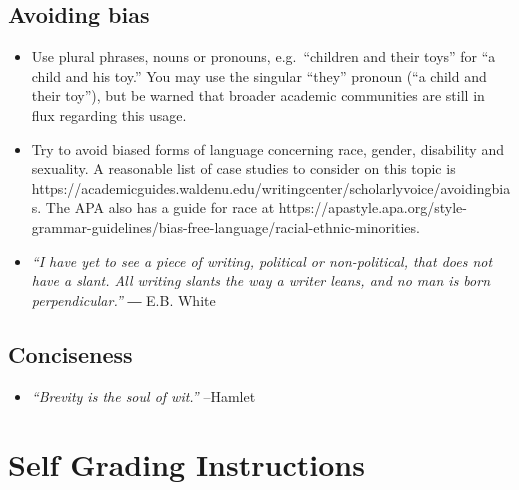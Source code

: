 \documentclass[
  letterpaper,
  DIV=11,
  numbers=noendperiod]{scrreprt}
\providecommand{\tightlist}{%
  \setlength{\itemsep}{0pt}\setlength{\parskip}{0pt}}\usepackage{longtable,booktabs,array}
\begin{document}
\hypertarget{avoiding-bias}{%
\section*{Avoiding bias}\label{avoiding-bias}}


\begin{itemize}
\tightlist
\item
  Use plural phrases, nouns or pronouns, e.g.~``children and their
  toys'' for ``a child and his toy.'' You may use the singular ``they''
  pronoun (``a child and their toy''), but be warned that broader
  academic communities are still in flux regarding this usage.
\item
  Try to avoid biased forms of language concerning race, gender,
  disability and sexuality. A reasonable list of case studies to
  consider on this topic is
  https://academicguides.waldenu.edu/writingcenter/scholarlyvoice/avoidingbias.
  The APA also has a guide for race at
  https://apastyle.apa.org/style-grammar-guidelines/bias-free-language/racial-ethnic-minorities.
\item
  \emph{``I have yet to see a piece of writing, political or
  non-political, that does not have a slant. All writing slants the way
  a writer leans, and no man is born perpendicular.''} ― E.B. White
\end{itemize}

\hypertarget{conciseness}{%
\section*{Conciseness}\label{conciseness}}


\begin{itemize}
\tightlist
\item
  \emph{``Brevity is the soul of wit.''} --Hamlet
\end{itemize}


\hypertarget{self-grading-instructions}{%
\chapter*{Self Grading Instructions}\label{self-grading-instructions}}
\end{document}
